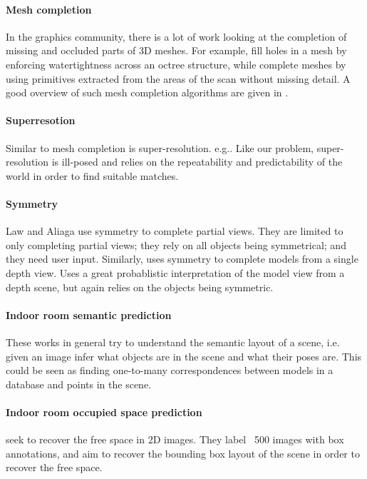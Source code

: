 \documentclass[10pt,a4paper]{article}
\makeatletter
\newcommand*{\eg}{e.g.\@\xspace}
\newcommand*{\ie}{i.e.\@\xspace}
\makeatother
\begin{document}
\paragraph{Mesh completion}
In the graphics community, there is a lot of work looking at the completion of missing and occluded parts of 3D meshes. 
For example, \cite{podolak-esgp-2005} fill holes in a mesh by enforcing watertightness across an octree structure, while \cite{schnabel-eurographics-2009} complete meshes by using primitives extracted from the areas of the scan without missing detail. 
A good overview of such mesh completion algorithms are given in \cite{ju-cst-2009}.

\paragraph{Superresotion}
Similar to mesh completion is super-resolution. \eg \cite{macaodha-eccv-2012}. Like our problem, super-resolution is ill-posed and relies on the repeatability and predictability of the world in order to find suitable matches.

\paragraph{Symmetry}
Law and Aliaga \cite{law-cviu-2010} use symmetry to complete partial views. They are limited to only completing partial views; they rely on all objects being symmetrical; and they need user input.
Similarly, \cite{thrun-iccv-2005} uses symmetry to complete models from a single depth view. Uses a great probablistic interpretation of the model view from a depth scene, but again relies on the objects being symmetric.

\paragraph{Indoor room semantic prediction}
These works in general try to understand the semantic layout of a scene, \ie given an image infer what objects are in the scene and what their poses are.
\cite{nan-acm-2012, minkim-siggraphasia-2012}
This could be seen as finding one-to-many correspondences between models in a database and points in the scene.

\paragraph{Indoor room occupied space prediction}
\cite{hedau-cvpr-2012} seek to recover the free space in 2D images. They label ~500 images with box annotations, and aim to recover the bounding box layout of the scene in order to recover the free space.
\end{document}
